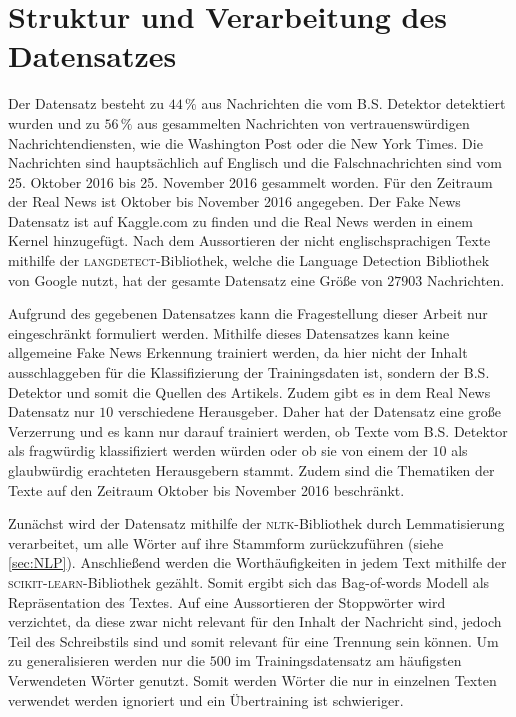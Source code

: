\chapter{Struktur und Verarbeitung des Datensatzes}
\label{sec:struct}

Der Datensatz besteht zu $44\,\%$ aus Nachrichten die vom B.S. Detektor detektiert wurden und zu $56\,\%$ aus gesammelten 
Nachrichten von vertrauenswürdigen Nachrichtendiensten, wie die Washington Post oder die New York Times. Die Nachrichten 
sind hauptsächlich auf Englisch und die Falschnachrichten sind vom 25. Oktober 2016 bis 25. November 2016 gesammelt worden. Für den Zeitraum 
der Real News ist Oktober bis November 2016 angegeben. 
Der Fake News Datensatz ist auf Kaggle.com zu finden\cite{fake_data} und die Real News werden in einem Kernel hinzugefügt\cite{real_data}.
Nach dem Aussortieren der nicht englischsprachigen Texte mithilfe der \textsc{langdetect}-Bibliothek\cite{langdetect}, welche die
Language Detection Bibliothek von Google\cite{google_langdetect} nutzt, hat der gesamte Datensatz eine Größe von 
$\num{27903}$ Nachrichten.

Aufgrund des gegebenen Datensatzes kann die Fragestellung dieser Arbeit nur eingeschränkt formuliert werden.
Mithilfe dieses Datensatzes kann keine allgemeine Fake News Erkennung trainiert werden, da hier nicht der Inhalt 
ausschlaggeben für die Klassifizierung der Trainingsdaten ist, sondern der B.S. Detektor und somit die Quellen des 
Artikels. 
Zudem gibt es in dem Real News Datensatz nur $10$ verschiedene Herausgeber.
Daher hat der Datensatz eine große Verzerrung und es kann nur darauf trainiert werden, ob Texte vom B.S. Detektor 
als fragwürdig klassifiziert werden würden oder ob sie von einem der $10$ als glaubwürdig erachteten Herausgebern stammt.
Zudem sind die Thematiken der Texte auf den Zeitraum Oktober bis November 2016 beschränkt.

Zunächst wird der Datensatz mithilfe der \textsc{nltk}-Bibliothek\cite{nltk} durch Lemmatisierung verarbeitet, um 
alle Wörter auf ihre Stammform zurückzuführen (siehe \autoref{sec:NLP}). 
Anschließend werden die Worthäufigkeiten in jedem Text mithilfe der \textsc{scikit-learn}-Bibliothek\cite{scikit-learn} 
gezählt. 
Somit ergibt sich das Bag-of-words Modell als Repräsentation des Textes.
Auf eine Aussortieren der Stoppwörter wird verzichtet, da diese zwar nicht relevant für den Inhalt der Nachricht sind,
jedoch Teil des Schreibstils sind und somit relevant für eine Trennung sein können.
Um zu generalisieren werden nur die $500$ im Trainingsdatensatz am häufigsten Verwendeten Wörter genutzt. 
Somit werden Wörter die nur in einzelnen Texten verwendet werden ignoriert und ein Übertraining ist schwieriger.


